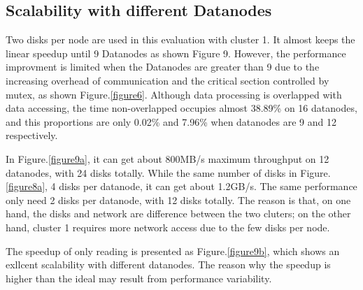 \documentclass[preprint,12pt]{elsarticle}
\begin{document}
\subsection{Scalability with different Datanodes}
Two disks per node are used in this evaluation with cluster 1. It almost keeps the linear speedup until 9 Datanodes as shown Figure 9. 
However, the performance improvment is limited when the Datanodes are greater than 9 due to the increasing overhead of communication
and the critical section controlled by mutex, as shown Figure.\ref{figure6}. Although data processing is overlapped with data accessing, 
the time non-overlapped occupies almost 38.89\% on 16 datanodes, and this proportions are only 0.02\% and 7.96\% when datanodes are 9 
and 12 respectively. \par
In Figure.\ref{figure9a}, it can get about 800MB/s maximum throughput on 12 datanodes, with 24 disks totally. While the same number of 
disks in Figure.\ref{figure8a}, 4 disks per datanode, it can get about 1.2GB/s. The same performance only need 2 disks per datanode, 
with 12 disks totally. The reason is that, on one hand, the disks and network are difference between the two cluters; on the other hand,
cluster 1 requires more network access due to the few disks per node.  \par
The speedup of only reading is presented as Figure.\ref{figure9b}, which shows an exllcent scalability with different datanodes. The 
reason why the speedup is higher than the ideal may result from performance variability. 
\end{document}
